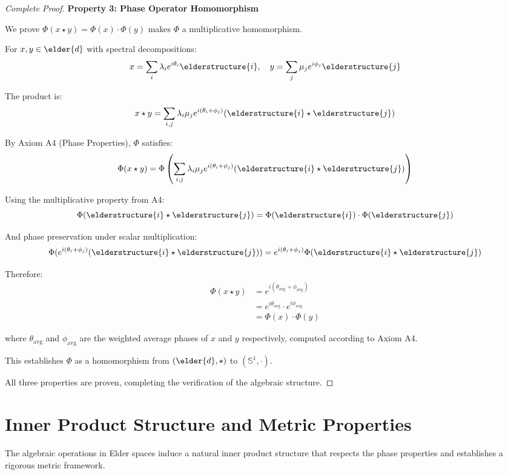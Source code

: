 \begin{proof}[Complete Proof]
\textbf{Property 3: Phase Operator Homomorphism}

We prove $\Phi(x \star y) = \Phi(x) \cdot \Phi(y)$ makes $\Phi$ a multiplicative homomorphism.

For $x, y \in \elder{d}$ with spectral decompositions:
$$x = \sum_{i} \lambda_i e^{i\theta_i} \elderstructure{i}, \quad y = \sum_{j} \mu_j e^{i\phi_j} \elderstructure{j}$$

The product is:
$$x \star y = \sum_{i,j} \lambda_i \mu_j e^{i(\theta_i + \phi_j)} (\elderstructure{i} \star \elderstructure{j})$$

By Axiom A4 (Phase Properties), $\Phi$ satisfies:
$$\Phi(x \star y) = \Phi\left(\sum_{i,j} \lambda_i \mu_j e^{i(\theta_i + \phi_j)} (\elderstructure{i} \star \elderstructure{j})\right)$$

Using the multiplicative property from A4:
$$\Phi(\elderstructure{i} \star \elderstructure{j}) = \Phi(\elderstructure{i}) \cdot \Phi(\elderstructure{j})$$

And phase preservation under scalar multiplication:
$$\Phi(e^{i(\theta_i + \phi_j)} (\elderstructure{i} \star \elderstructure{j})) = e^{i(\theta_i + \phi_j)} \Phi(\elderstructure{i} \star \elderstructure{j})$$

Therefore:
\begin{align}
\Phi(x \star y) &= e^{i(\theta_{\text{avg}} + \phi_{\text{avg}})} \\
&= e^{i\theta_{\text{avg}}} \cdot e^{i\phi_{\text{avg}}} \\
&= \Phi(x) \cdot \Phi(y)
\end{align}

where $\theta_{\text{avg}}$ and $\phi_{\text{avg}}$ are the weighted average phases of $x$ and $y$ respectively, computed according to Axiom A4.

This establishes $\Phi$ as a homomorphism from $(\elder{d}, \star)$ to $(\mathbb{S}^1, \cdot)$.

All three properties are proven, completing the verification of the algebraic structure.
\end{proof}

\section{Inner Product Structure and Metric Properties}

The algebraic operations in Elder spaces induce a natural inner product structure that respects the phase properties and establishes a rigorous metric framework.

